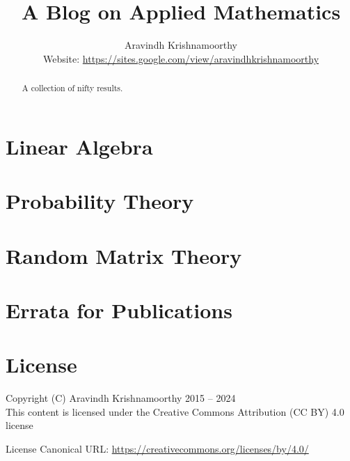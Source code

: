 \documentclass[a4paper,dvipsnames]{report}
\title{A Blog on Applied Mathematics}
\author{Aravindh Krishnamoorthy\\\small Website: \url{https://sites.google.com/view/aravindhkrishnamoorthy}}
\begin{document}
\maketitle
\renewcommand{\abstractname}{Preface}
\begin{abstract}
\begin{center}
 	A collection of nifty results.
\end{center}
\end{abstract}
\tableofcontents

\chapter{Linear Algebra}




\chapter{Probability Theory}





\chapter{Random Matrix Theory}



\chapter{Errata for Publications}


\chapter{License}
Copyright (C) Aravindh Krishnamoorthy 2015 -- 2024\\
This content is licensed under the Creative Commons Attribution (CC BY) 4.0 license

\noindent License Canonical URL: \url{https://creativecommons.org/licenses/by/4.0/}


\end{document}
